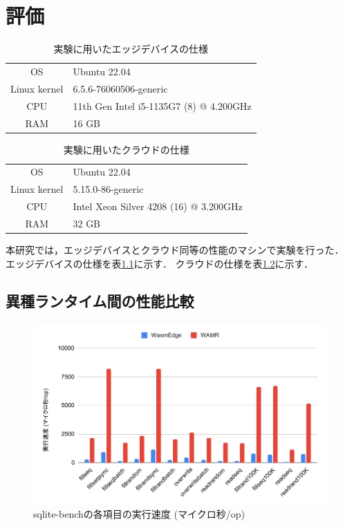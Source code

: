 \chapter{評価}
\begin{table}[t]
    \caption{実験に用いたエッジデバイスの仕様}
    \label{table:device-machine-spec}
    \centering
    \scalebox{1} {
    \begin{tabular}{c|l} \hline\hline
        OS & Ubuntu 22.04 \\
        Linux kernel & 6.5.6-76060506-generic \\
        CPU & 11th Gen Intel i5-1135G7 (8) @ 4.200GHz \\
        RAM & 16 GB \\ \hline
    \end{tabular}
    }
\end{table}

\begin{table}[t]
    \caption{実験に用いたクラウドの仕様}
    \label{table:cloud-machine-spec}
    \centering
    \scalebox{1} {
    \begin{tabular}{c|l} \hline\hline
        OS & Ubuntu 22.04 \\
        Linux kernel & 5.15.0-86-generic \\
        CPU & Intel Xeon Silver 4208 (16) @ 3.200GHz \\
        RAM & 32 GB \\ \hline
    \end{tabular}
    }
\end{table}


本研究では，エッジデバイスとクラウド同等の性能のマシンで実験を行った．
エッジデバイスの仕様を表\ref{table:device-machine-spec}に示す．
クラウドの仕様を表\ref{table:cloud-machine-spec}に示す．


\section{異種ランタイム間の性能比較}
\begin{figure}[t]
    \centering
    \includegraphics*[width=1\linewidth]{images/wasm_speed}
    \caption{sqlite-benchの各項目の実行速度 (マイクロ秒/op)}
    \label{fig:sqlite-bench-speed}
\end{figure}

